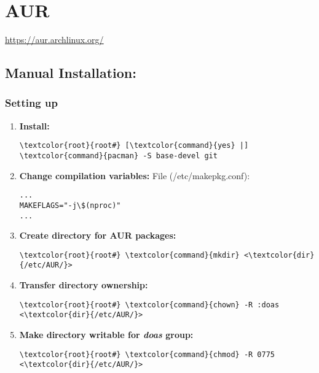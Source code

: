 \documentclass[10pt, a4paper, onecolumn, openany]{book} %
\begin{document}
\section{AUR}
\underline{\href{https://aur.archlinux.org/}{https://aur.archlinux.org/}}
\subsection{Manual Installation:}
\subsubsection{Setting up}
\begin{enumerate}
    \item \textbf{Install:}
\begin{Verbatim}[commandchars=\\\{\}]
\textcolor{root}{root#} [\textcolor{command}{yes} |] \textcolor{command}{pacman} -S base-devel git
\end{Verbatim}
    \item \textbf{Change compilation variables:}
\newline File (\textcolor{file}{/etc/makepkg.conf}):
\begin{Verbatim}[commandchars=\\\{\}]
...
MAKEFLAGS="-j\$(nproc)"
...
\end{Verbatim}
    \item \textbf{Create directory for AUR packages:}
\begin{Verbatim}[commandchars=\\\{\}]
\textcolor{root}{root#} \textcolor{command}{mkdir} <\textcolor{dir}{/etc/AUR/}>
\end{Verbatim}
    \item \textbf{Transfer directory ownership:}
\begin{Verbatim}[commandchars=\\\{\}]
\textcolor{root}{root#} \textcolor{command}{chown} -R :doas <\textcolor{dir}{/etc/AUR/}>
\end{Verbatim}
    \item \textbf{Make directory writable for \textit{doas} group:}
\begin{Verbatim}[commandchars=\\\{\}]
\textcolor{root}{root#} \textcolor{command}{chmod} -R 0775 <\textcolor{dir}{/etc/AUR/}>
\end{Verbatim}
\end{enumerate}
\end{document}
